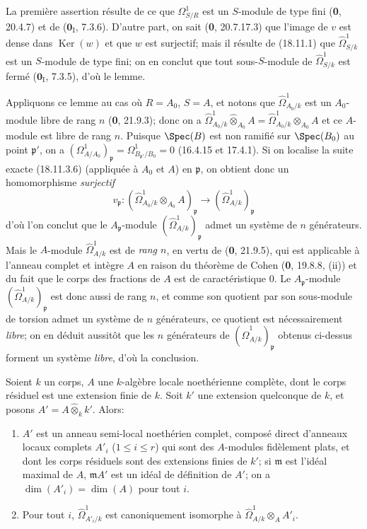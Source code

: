 La première assertion résulte de ce que $\Omega^1_{S/R}$ est un $S$-module de type fini (\textbf{0}, 20.4.7) et de ($\mathbf{0}_{\mathrm I}$, 7.3.6). D'autre part, on sait (\textbf{0}, 20.7.17.3) que l'image de $v$ est dense dans $\operatorname{Ker}(w)$ et que $w$ est surjectif; mais il résulte de (18.11.1) que $\hat{\Omega}^1_{S/k}$ est un $S$-module de type fini; on en conclut que tout sous-$S$-module de $\hat{\Omega}^1_{S/k}$ est fermé ($\mathbf{0}_{\mathrm I}$, 7.3.5), d'où le lemme.

Appliquons ce lemme au cas où $R=A_0$, $S=A$, et notons que $\hat{\Omega}^1_{A_0/k}$ est un $A_0$-module libre de rang $n$ (\textbf{0}, 21.9.3); donc on a $\hat{\Omega}^1_{A_0/k}\widehat{\otimes}_{A_0}A=\hat{\Omega}^1_{A_0/k}\otimes_{A_0}A$ et ce $A$-module est libre de rang $n$. Puisque $\Spec(B)$ est non ramifié sur $\Spec(B_0)$ au point $\mathfrak p'$, on a $(\Omega^1_{A/A_0})_{\mathfrak p}=\Omega^1_{B_{\mathfrak p'}/B_0}=0$ (16.4.15 et 17.4.1). Si on localise la suite exacte (18.11.3.6) (appliquée à $A_0$ et $A$) en $\mathfrak p$, on obtient donc un homomorphisme \emph{surjectif}
\[
  v_{\mathfrak p}:(\hat{\Omega}^1_{A_0/k}\otimes_{A_0}A)_{\mathfrak p}\longrightarrow(\hat{\Omega}^1_{A/k})_{\mathfrak p}
\]
d'où l'on conclut que le $A_{\mathfrak p}$-module $(\hat{\Omega}^1_{A/k})_{\mathfrak p}$ admet un système de $n$ générateurs. Mais le $A$-module $\hat{\Omega}^1_{A/k}$ est de \emph{rang $n$}, en vertu de (\textbf{0}, 21.9.5), qui est applicable à l'anneau complet et intègre $A$ en raison du théorème de Cohen (\textbf{0}, 19.8.8, (ii)) et du fait que le corps des fractions de $A$ est de caractéristique 0. Le $A_{\mathfrak p}$-module $(\hat{\Omega}^1_{A/k})_{\mathfrak p}$ est donc aussi de rang $n$, et comme son quotient par son sous-module de torsion admet un système de $n$ générateurs, ce quotient est nécessairement \emph{libre}; on en déduit aussitôt que les $n$ générateurs de $(\hat{\Omega}^1_{A/k})_{\mathfrak p}$ obtenus ci-dessus forment un système \emph{libre}, d'où la conclusion.

\begin{lemma}[18.11.4]
\label{IV.18.11.4}
Soient $k$ un corps, $A$ une $k$-algèbre locale noethérienne complète, dont le corps résiduel est une extension finie de $k$. Soit $k'$ une extension quelconque de $k$, et posons $A'=A\widehat{\otimes}_k k'$. Alors:
\begin{enumerate}
  \item[\textup{(i)}] $A'$ est un anneau semi-local noethérien complet, composé direct d'anneaux locaux complets $A'_i$ \textup{($1\leq i\leq r$)} qui sont des $A$-modules fidèlement plats, et dont les corps résiduels sont des extensions finies de $k'$; si $\mathfrak m$ est l'idéal maximal de $A$, $\mathfrak mA'$ est un idéal de définition de $A'$; on a $\dim(A'_i)=\dim(A)$ pour tout $i$.
  \item[\textup{(ii)}] Pour tout $i$, $\hat{\Omega}^1_{A'_i/k}$ est canoniquement isomorphe à $\hat{\Omega}^1_{A/k}\otimes_A A'_i$.
\end{enumerate}
\end{lemma}

